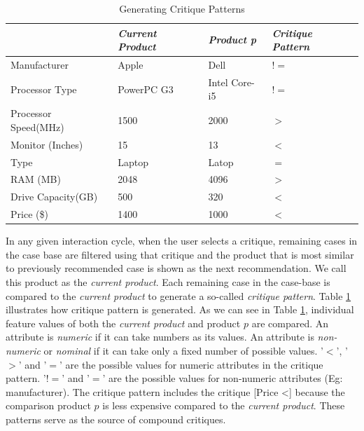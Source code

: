 \begin{table}[h]
\caption{Generating Critique Patterns}
\centering
\renewcommand{\arraystretch}{1.2}
\label{tab:critiquePatterns}

\begin{tabular}{|l|l|l|l|}
\hline
& \textit{Current Product} & \textit{Product p} & \textit{Critique Pattern}\\
\hline
Manufacturer & Apple & Dell & $!=$\\
\hline
Processor Type & PowerPC G3 & Intel Core-i5 & $!=$\\
\hline
Processor Speed(MHz) & 1500 & 2000 & $>$ \\
\hline
Monitor (Inches) & 15  & 13 & $<$\\
\hline
Type & Laptop & Latop & $=$\\ 
\hline
RAM (MB) & 2048 & 4096 & $>$ \\
\hline
Drive Capacity(GB) & 500 & 320 & $<$ \\
\hline
Price (\$) & 1400 & 1000 & $<$\\
\hline
\end{tabular}
\end{table}

In any given interaction cycle, when the user selects a critique, remaining cases in the case base are filtered using that critique and the product that is most similar to previously recommended case is shown as the next recommendation.
We call this product as the \textit{current product}.
Each remaining case in the case-base is compared to the \textit{current product} to generate a so-called \textit{critique pattern}. 
Table \ref{tab:critiquePatterns} illustrates how critique pattern is generated.
As we can see in Table \ref{tab:critiquePatterns}, individual feature values of both the \textit{current product} and product $p$ are compared.
An attribute is \textit{numeric} if it can take numbers as its values.
An attribute is \textit{non-numeric} or \textit{nominal} if it can take only a fixed number of possible values.
'$<$', '$>$' and '$=$' are the possible values for numeric attributes in the critique pattern.
'$!=$' and '$=$' are the possible values for non-numeric attributes (Eg: manufacturer).
The critique pattern includes the critique [Price \textless] because the comparison product $p$ is less expensive compared to the \textit{current product}.
These patterns serve as the source of compound critiques.


